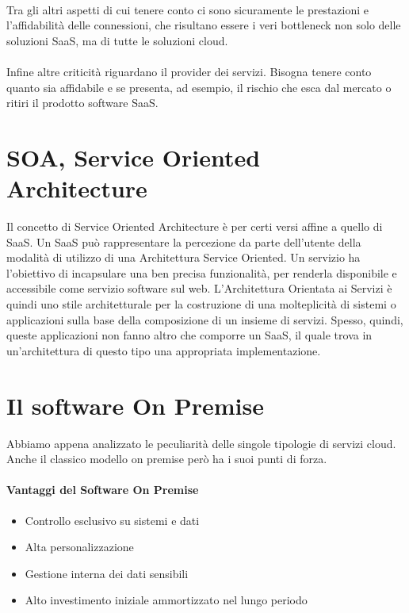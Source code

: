 \paragraph{}
Tra gli altri aspetti di cui tenere conto ci sono sicuramente le prestazioni e l'affidabilità delle connessioni, che risultano essere i veri bottleneck non solo delle soluzioni SaaS, ma di tutte le soluzioni cloud. 
\paragraph{}
Infine altre criticità riguardano il provider dei servizi. Bisogna tenere conto quanto sia affidabile e se presenta, ad esempio, il rischio che esca dal mercato o ritiri il prodotto software SaaS. 


\section{SOA, Service Oriented Architecture}
Il concetto di Service Oriented Architecture è per certi versi affine a quello di SaaS. Un SaaS può rappresentare la percezione da parte dell'utente della modalità di utilizzo di una Architettura Service Oriented. Un servizio ha l’obiettivo di incapsulare una ben precisa funzionalità, per renderla disponibile e accessibile come servizio software sul web. L'Architettura Orientata ai Servizi è quindi uno stile architetturale per la costruzione di una molteplicità di sistemi o applicazioni sulla base della composizione di un insieme di servizi. Spesso, quindi, queste applicazioni non fanno altro che comporre un SaaS, il quale trova in un'architettura di questo tipo una appropriata implementazione.
\section{Il software On Premise}
Abbiamo appena analizzato le peculiarità delle singole tipologie di servizi cloud. Anche il classico modello on premise però ha i suoi punti di forza.
\paragraph{Vantaggi del Software On Premise}
\begin{itemize}
	\item Controllo esclusivo su sistemi e dati
	\item Alta personalizzazione
	\item Gestione interna dei dati sensibili
	\item Alto investimento iniziale ammortizzato nel lungo periodo
\end{itemize}

